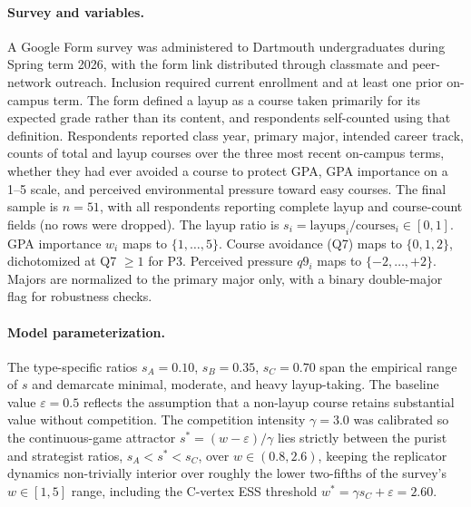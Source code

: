 \documentclass[12pt]{article}
\begin{document}
\paragraph{Survey and variables.}
A Google Form survey was administered to Dartmouth undergraduates
during Spring term 2026, with the form link distributed through
classmate and peer-network outreach. Inclusion required current
enrollment and at least one prior on-campus term. The form defined a
layup as a course taken primarily for its expected grade rather than
its content, and respondents self-counted using that definition.
Respondents reported class year, primary major, intended career track,
counts of total and layup courses over the three most recent on-campus
terms, whether they had ever avoided a course to protect GPA, GPA
importance on a 1--5 scale, and perceived environmental pressure
toward easy courses. The
final sample is $n = 51$, with all respondents reporting complete
layup and course-count fields (no rows were dropped). The layup ratio
is $s_i = \text{layups}_i / \text{courses}_i \in [0, 1]$.
GPA importance $w_i$ maps to $\{1, \dots, 5\}$. Course avoidance (Q7)
maps to $\{0, 1, 2\}$, dichotomized at Q7 $\geq 1$ for P3. Perceived
pressure $q9_i$ maps to $\{-2, \dots, +2\}$. Majors are normalized to
the primary major only, with a binary double-major flag for robustness
checks.

\paragraph{Model parameterization.}
The type-specific ratios $s_A = 0.10$, $s_B = 0.35$, $s_C = 0.70$ span
the empirical range of $s$ and demarcate minimal, moderate, and heavy
layup-taking. The baseline value $\varepsilon = 0.5$ reflects the
assumption that a non-layup course retains substantial value without
competition. The competition intensity $\gamma = 3.0$ was calibrated
so the continuous-game attractor $s^\ast = (w - \varepsilon)/\gamma$
lies strictly between the purist and strategist ratios,
$s_A < s^\ast < s_C$, over $w \in (0.8, 2.6)$, keeping the replicator
dynamics non-trivially interior over roughly the lower two-fifths of
the survey's $w \in [1, 5]$ range, including the
C-vertex ESS threshold $w^\ast = \gamma s_C + \varepsilon = 2.60$.
\end{document}
